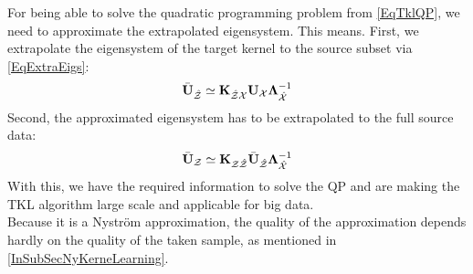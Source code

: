 For being able to solve the quadratic programming problem from \eqref{EqTklQP}, we need to approximate the extrapolated eigensystem.
This means. First, we extrapolate the eigensystem of the target kernel to the source subset via \eqref{EqExtraEigs}:
\begin{equation}
\bar{\mathbf{U}}_\mathcal{\hat{Z}}\simeq\mathbf{K}_{\mathcal{\hat{Z}X}}\mathbf{U}_{\mathcal{X}}\boldsymbol{\Lambda}_\mathcal{\hat{X}}^{-1}
\end{equation}
Second, the approximated eigensystem has to be extrapolated to the full source data:
\begin{equation}
\bar{\mathbf{U}}_\mathcal{Z} \simeq \mathbf{K}_{\mathcal{Z\hat{Z}}}\bar{\mathbf{U}}_\mathcal{\hat{Z}}\boldsymbol{\Lambda}_\mathcal{\hat{X}}^{-1}
\end{equation}
With this, we have the required information to solve the \acl{QP} and are making the \acs{TKL} algorithm large scale and applicable for big data.\cite{Long.2015}\\
Because it is a Nyström approximation, the quality of the approximation depends hardly on the quality of the taken sample, as mentioned in \ref{InSubSecNyKerneLearning}.